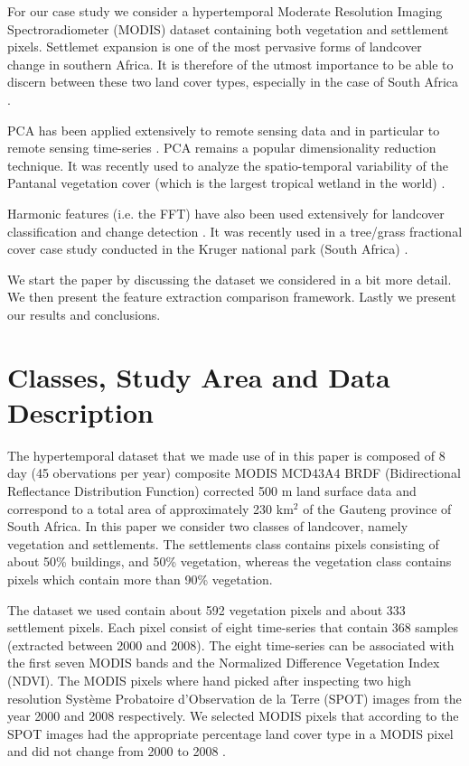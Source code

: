 \documentclass{article}
\begin{document}
For our case study we consider a hypertemporal Moderate Resolution Imaging Spectroradiometer (MODIS) dataset containing both vegetation and settlement pixels.
Settlemet expansion is one of the most pervasive forms of landcover change in southern Africa. It is therefore of the utmost importance to be able to discern 
between these two land cover types, especially in the case of South Africa \cite{grobler2012}. 

PCA has been applied extensively to remote sensing data \cite{byrne1980,crist1984} and in particular to remote sensing time-series \cite{eastman1993,hall2003}. PCA remains a popular dimensionality reduction technique. It was recently used to analyze the spatio-temporal variability of 
the Pantanal vegetation cover (which is the largest tropical wetland in the world) \cite{almeida2015}.  %

Harmonic features (i.e. the FFT) have also been used extensively for landcover classification and change detection \cite{jakubauskas2002}. It was recently used in a tree/grass fractional cover case study conducted in 
the Kruger national park (South Africa) \cite{ibrahim2018}.

We start the paper by discussing the dataset we considered in a bit more detail. We then present the feature extraction comparison framework. Lastly we present our results and conclusions.

\section{Classes, Study Area and Data Description}
The hypertemporal dataset that we made use of in this paper is composed of 8 day (45 obervations per year) composite MODIS MCD43A4 BRDF (Bidirectional Reflectance Distribution Function) corrected 500 m land surface
data and correspond to a total area of approximately 230 km$^2$  of the Gauteng province of South Africa. 
In this paper we consider two classes of landcover, namely vegetation and settlements. The settlements class contains pixels consisting of about
50\% buildings, and 50\% vegetation, whereas the vegetation class contains pixels which contain more than 90\% vegetation. 

The dataset we used contain about 592 vegetation pixels and about 333 settlement pixels. Each pixel consist of eight time-series that contain 368 samples (extracted between 2000 and 2008). The eight time-series can be associated with the first seven MODIS bands and the Normalized Difference Vegetation Index (NDVI).
The MODIS pixels where hand picked after inspecting two high resolution Système Probatoire d’Observation de la Terre (SPOT) images from the year 2000 and 2008 respectively. 
We selected MODIS pixels that according to the SPOT images had the appropriate percentage land cover type in a MODIS pixel and did not change from 2000 to 2008 \cite{ackermann2011}.
\end{document}
